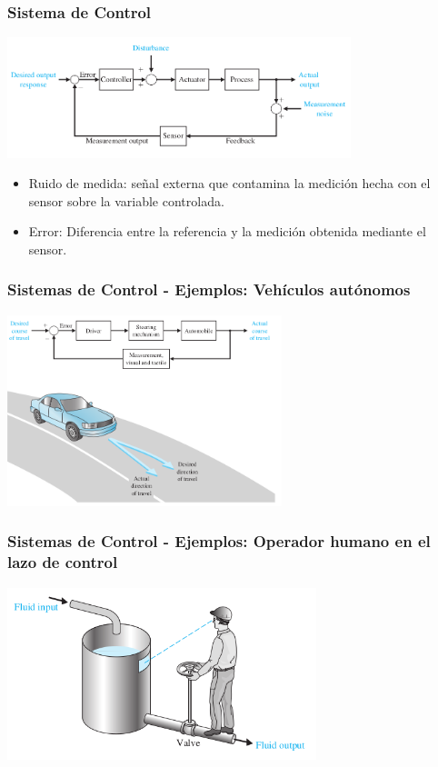 \documentclass[aspectratio=169,handout]{beamer}
\theoremstyle{definition}
\theoremstyle{plain}
\theoremstyle{remark}
\begin{document}
\begin{frame}[<+->][c]\frametitle{Sistema de Control}
  \vspace*{-0.2cm}
  \begin{center}
    \includegraphics[width=10cm]{images/closedloopcontrol2.png}
  \end{center}
  \vspace*{-0.7cm}
  \begin{itemize}
    \item Ruido de medida: señal externa que contamina la medición hecha con el sensor sobre la variable controlada.
    \item Error: Diferencia entre la referencia y la medición obtenida mediante el sensor.
  \end{itemize}
\end{frame}

\begin{frame}[c]\frametitle{Sistemas de Control - Ejemplos: Vehículos autónomos}
  \begin{center}
    \includegraphics[width=8cm]{images/controlsystem_example1.png}
  \end{center}
\end{frame}

\begin{frame}[c]\frametitle{Sistemas de Control - Ejemplos: Operador humano en el lazo de control}
  \begin{center}
    \includegraphics[width=9cm]{images/controlsystem_example2.png}
  \end{center}
\end{frame}
\end{document}
